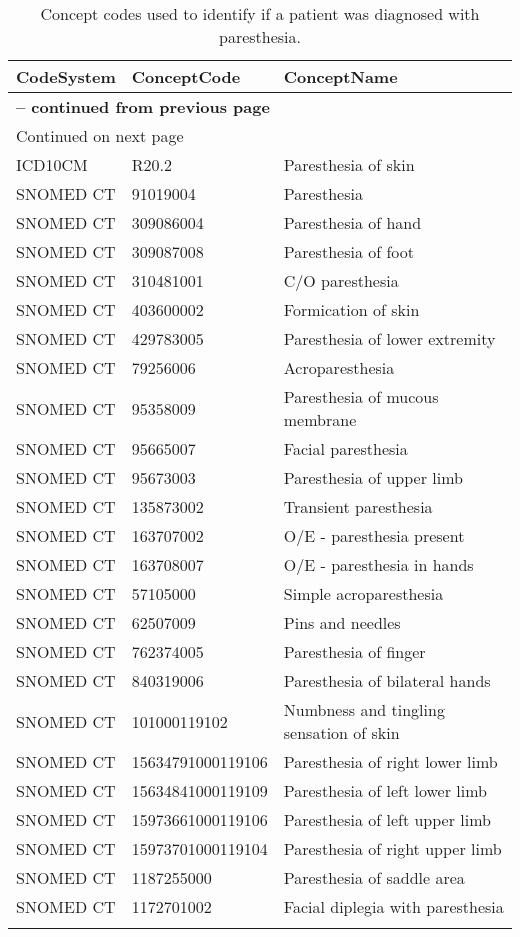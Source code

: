 \begin{longtable}{p{}p{}p{}}
\caption{Concept codes used to identify if a patient was diagnosed with paresthesia.} \\ 
 CodeSystem & ConceptCode & ConceptName \\ 
  \hline 
\endfirsthead 
\multicolumn{3}{p{\textwidth}}{{ \bfseries \tablename \thetable{} -- continued from previous page}} \ 
\hline CodeSystem & ConceptCode & ConceptName \\ \hline 
\endhead 
\hline \multicolumn{3}{p{\textwidth}}{{Continued on next page}} \\ \hline 
\endfoot 
\hline 
\endlastfoot 
 \hline
ICD10CM & R20.2 & Paresthesia of skin \\ 
  SNOMED CT & 91019004 & Paresthesia \\ 
  SNOMED CT & 309086004 & Paresthesia of hand \\ 
  SNOMED CT & 309087008 & Paresthesia of foot \\ 
  SNOMED CT & 310481001 & C/O paresthesia \\ 
  SNOMED CT & 403600002 & Formication of skin \\ 
  SNOMED CT & 429783005 & Paresthesia of lower extremity \\ 
  SNOMED CT & 79256006 & Acroparesthesia \\ 
  SNOMED CT & 95358009 & Paresthesia of mucous membrane \\ 
  SNOMED CT & 95665007 & Facial paresthesia \\ 
  SNOMED CT & 95673003 & Paresthesia of upper limb \\ 
  SNOMED CT & 135873002 & Transient paresthesia \\ 
  SNOMED CT & 163707002 & O/E - paresthesia present \\ 
  SNOMED CT & 163708007 & O/E - paresthesia in hands \\ 
  SNOMED CT & 57105000 & Simple acroparesthesia \\ 
  SNOMED CT & 62507009 & Pins and needles \\ 
  SNOMED CT & 762374005 & Paresthesia of finger \\ 
  SNOMED CT & 840319006 & Paresthesia of bilateral hands \\ 
  SNOMED CT & 101000119102 & Numbness and tingling sensation of skin \\ 
  SNOMED CT & 15634791000119106 & Paresthesia of right lower limb \\ 
  SNOMED CT & 15634841000119109 & Paresthesia of left lower limb \\ 
  SNOMED CT & 15973661000119106 & Paresthesia of left upper limb \\ 
  SNOMED CT & 15973701000119104 & Paresthesia of right upper limb \\ 
  SNOMED CT & 1187255000 & Paresthesia of saddle area \\ 
  SNOMED CT & 1172701002 & Facial diplegia with paresthesia \\ 
  \hline
\label{tab:codes_paresthesia}
\end{longtable}
